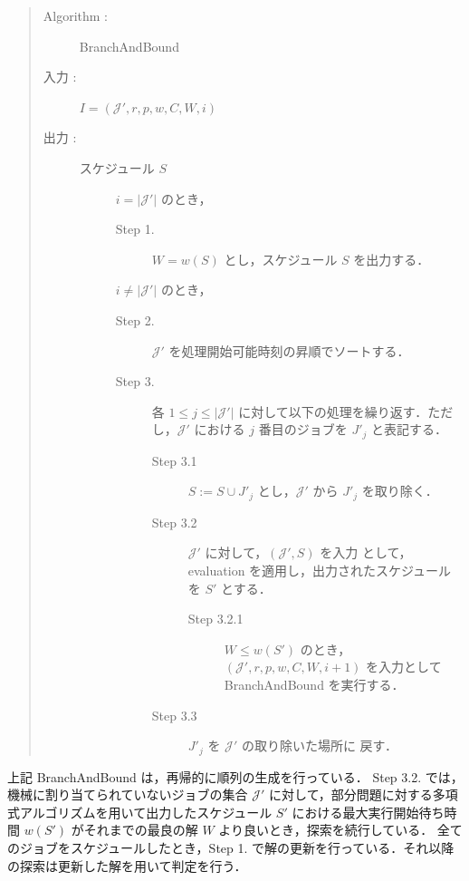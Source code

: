 \documentclass[12pt]{optlab-bachelor}
\begin{document}
\begin{quote}
  \begin{description}
    \item[{\sc Algorithm : }] {\sc BranchAndBound}
    \item[入力 :] $I = (\mathcal{J}',r,p,w,C,W,i)$
    \item[出力 :] スケジュール $S$
    \begin{description}
      \item[] $i = |\mathcal{J}'|$ のとき，
      \begin{description}
        \item[Step 1.] $W = w(S)$ とし，スケジュール $S$ を出力する．
      \end{description}
      \item[] $i \neq |\mathcal{J}'|$ のとき，
      \begin{description}
        \item[Step 2.] $\mathcal{J}'$ を処理開始可能時刻の昇順でソートする．
        \item[Step 3.] 各 $1 \le j \le |\mathcal{J}'|$ に対して以下の処理を繰り返す．ただし，$\mathcal{J}'$ における $j$ 番目のジョブを $J'_j$ と表記する．
        \begin{description}
          \item[Step 3.1] $S := S \cup J'_j$ とし，$\mathcal{J}'$ から $J'_j$ を取り除く．
          \item[Step 3.2] $\mathcal{J}'$ に対して，$(\mathcal{J}',S)$ を入力
          として，{\sc evaluation} を適用し，出力されたスケジュールを $S'$ とする．
          \begin{description}
            \item[Step 3.2.1] $W \le w(S')$ のとき，$(\mathcal{J}',r,p,w,C,W,i + 1)$ を入力として {\sc BranchAndBound} を実行する．
          \end{description}
          \item[Step 3.3] $J'_j$ を $\mathcal{J}'$ の取り除いた場所に
          戻す．
        \end{description}
      \end{description}
    \end{description}
  \end{description}
\end{quote}

上記 {\sc BranchAndBound} は，再帰的に順列の生成を行っている．
Step 3.2. では，機械に割り当てられていないジョブの集合 $\mathcal{J}'$ に対して，部分問題に対する多項式アルゴリズムを用いて出力したスケジュール $S'$ における最大実行開始待ち時間 $w(S')$ がそれまでの最良の解 $W$ より良いとき，探索を続行している．
全てのジョブをスケジュールしたとき，Step 1. で解の更新を行っている．それ以降の探索は更新した解を用いて判定を行う．
\end{document}
